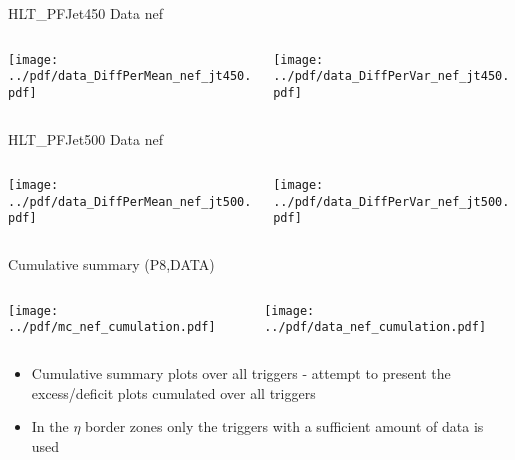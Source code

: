 \documentclass[9pt]{beamer}
\begin{document}
\begin{frame}[t]{HLT\_PFJet450 Data nef}
\begin{columns}[T]
  \begin{column}{.5\textwidth}
  \texttt{[image: ../pdf/data\_DiffPerMean\_nef\_jt450.pdf]}
  \end{column}
  \begin{column}{.5\textwidth}
  \texttt{[image: ../pdf/data\_DiffPerVar\_nef\_jt450.pdf]}
  \end{column}
\end{columns}
\end{frame}

\begin{frame}[t]{HLT\_PFJet500 Data nef}
\begin{columns}[T]
  \begin{column}{.5\textwidth}
  \texttt{[image: ../pdf/data\_DiffPerMean\_nef\_jt500.pdf]}
  \end{column}
  \begin{column}{.5\textwidth}
  \texttt{[image: ../pdf/data\_DiffPerVar\_nef\_jt500.pdf]}
  \end{column}
\end{columns}
\end{frame}

\begin{frame}[t]{Cumulative summary (P8,DATA)}
\begin{columns}[T]
  \begin{column}{.5\textwidth}
  \texttt{[image: ../pdf/mc\_nef\_cumulation.pdf]}
  \end{column}
  \begin{column}{.5\textwidth}
  \texttt{[image: ../pdf/data\_nef\_cumulation.pdf]}
  \end{column}
\end{columns}
\begin{itemize}
 \item Cumulative summary plots over all triggers - attempt to present the excess/deficit plots cumulated over all triggers
 \item In the $\eta$ border zones only the triggers with a sufficient amount of data is used
\end{itemize}
\end{frame}
\end{document}
